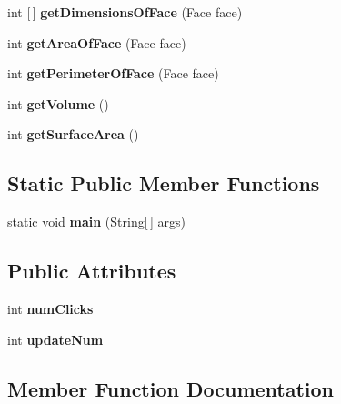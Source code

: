 \begin{DoxyCompactItemize}
int \mbox{[}$\,$\mbox{]} {\bfseries get\+Dimensions\+Of\+Face} (Face face)
\item 
\mbox{\label{class_d_o_m_content_loaded_a9617727fe50b8180d45e3409e0797e72}} 
int {\bfseries get\+Area\+Of\+Face} (Face face)
\item 
\mbox{\label{class_d_o_m_content_loaded_afd26d2503df2334a81f87367e7666e69}} 
int {\bfseries get\+Perimeter\+Of\+Face} (Face face)
\item 
\mbox{\label{class_d_o_m_content_loaded_a158dcdd034a580a0dc4d24f26fbaaf44}} 
int {\bfseries get\+Volume} ()
\item 
\mbox{\label{class_d_o_m_content_loaded_aa6d7fbbbcfff60212ed64d5c6c135898}} 
int {\bfseries get\+Surface\+Area} ()
\end{DoxyCompactItemize}
\subsection*{Static Public Member Functions}
\begin{DoxyCompactItemize}
\item 
\mbox{\label{class_d_o_m_content_loaded_a5b0e8cef3698f9f550a7e6f592872fb7}} 
static void {\bfseries main} (String\mbox{[}$\,$\mbox{]} args)
\end{DoxyCompactItemize}
\subsection*{Public Attributes}
\begin{DoxyCompactItemize}
\item 
\mbox{\label{class_d_o_m_content_loaded_a62ba4aaa6fb7322d125e7f5f5b2a91ec}} 
int {\bfseries num\+Clicks}
\item 
\mbox{\label{class_d_o_m_content_loaded_a8d1dde1fba9833ca47cf48b8fac4f5fc}} 
int {\bfseries update\+Num}
\end{DoxyCompactItemize}


\subsection{Member Function Documentation}
\mbox{\label{class_d_o_m_content_loaded_a3ada13c27e30a7921dc6de3d0928b8d6}} 
